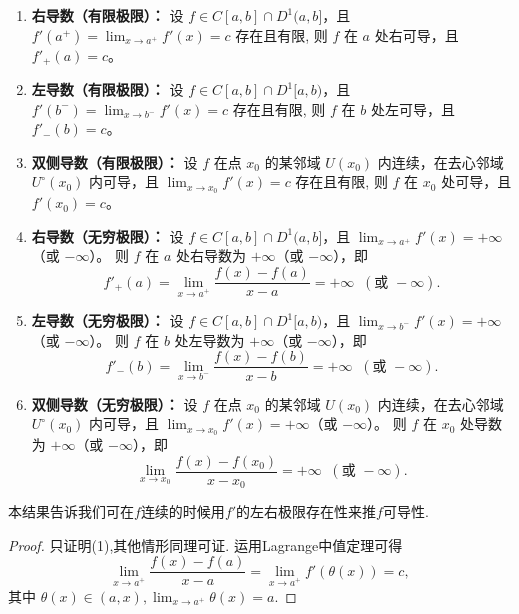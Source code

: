 \documentclass[../../main.tex]{subfiles}%
\begin{document}
\begin{theorem}[导数极限定理]\label{theorem:导数极限定理}
\begin{enumerate}[(1)]
\item \textbf{右导数（有限极限）：} 
设 $f\in C[a,b]\cap D^1(a,b]$，且 $f'(a^+)=\displaystyle \lim_{x\to a^+} f'(x)=c$ 存在且有限,  
则 $f$ 在 $a$ 处右可导，且 $f'_+(a)=c$。

\item \textbf{左导数（有限极限）：} 
设 $f\in C[a,b]\cap D^1[a,b)$，且 $f'(b^-)=\displaystyle \lim_{x\to b^-} f'(x)=c$ 存在且有限,  
则 $f$ 在 $b$ 处左可导，且 $f'_-(b)=c$。

\item \textbf{双侧导数（有限极限）：} 
设 $f$ 在点 $x_0$ 的某邻域 $U(x_0)$ 内连续，在去心邻域 $U^\circ(x_0)$ 内可导，且 $\displaystyle \lim_{x\to x_0} f'(x)=c$ 存在且有限,
则 $f$ 在 $x_0$ 处可导，且 $f'(x_0)=c$。

\item \textbf{右导数（无穷极限）：} 
设 $f\in C[a,b]\cap D^1(a,b]$，且 $\displaystyle \lim_{x\to a^+} f'(x)=+\infty$（或 $-\infty$）。  
则 $f$ 在 $a$ 处右导数为 $+\infty$（或 $-\infty$），即
\[
f'_+(a)=\lim_{x\to a^+}\frac{f(x)-f(a)}{x-a}=+\infty\;\;(\text{或 }-\infty).
\]

\item \textbf{左导数（无穷极限）：} 
设 $f\in C[a,b]\cap D^1[a,b)$，且 $\displaystyle \lim_{x\to b^-} f'(x)=+\infty$（或 $-\infty$）。  
则 $f$ 在 $b$ 处左导数为 $+\infty$（或 $-\infty$），即
\[
f'_-(b)=\lim_{x\to b^-}\frac{f(x)-f(b)}{x-b}=+\infty\;\;(\text{或 }-\infty).
\]

\item \textbf{双侧导数（无穷极限）：} 
设 $f$ 在点 $x_0$ 的某邻域 $U(x_0)$ 内连续，在去心邻域 $U^\circ(x_0)$ 内可导，且 $\displaystyle \lim_{x\to x_0} f'(x)=+\infty$（或 $-\infty$）。  
则 $f$ 在 $x_0$ 处导数为 $+\infty$（或 $-\infty$），即
\[
\lim_{x\to x_0}\frac{f(x)-f(x_0)}{x-x_0}=+\infty\;\;(\text{或 }-\infty).
\]
\end{enumerate}
\end{theorem}
\begin{remark}
本结果告诉我们可在\(f\)连续的时候用\(f'\)的左右极限存在性来推\(f\)可导性.
\end{remark}
\begin{proof}

只证明(1),其他情形同理可证.
运用Lagrange中值定理可得
\[\lim_{x\rightarrow a^{+}}\frac{f(x)-f(a)}{x - a}=\lim_{x\rightarrow a^{+}}f'(\theta(x))=c,\]
其中
\(\theta(x)\in(a,x),\lim_{x\rightarrow a^{+}}\theta(x)=a.\)

\end{proof}
\end{document}
